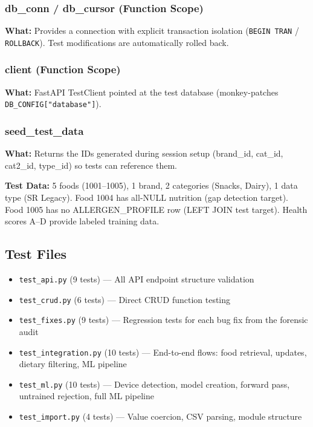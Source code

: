 \documentclass[12pt,a4paper]{article}
\begin{document}
\subsubsection{db\_conn / db\_cursor (Function Scope)}
\textbf{What:} Provides a connection with explicit transaction isolation (\texttt{BEGIN TRAN} / \texttt{ROLLBACK}). Test modifications are automatically rolled back.

\subsubsection{client (Function Scope)}
\textbf{What:} FastAPI TestClient pointed at the test database (monkey-patches \texttt{DB\_CONFIG["database"]}).

\subsubsection{seed\_test\_data}
\textbf{What:} Returns the IDs generated during session setup (brand\_id, cat\_id, cat2\_id, type\_id) so tests can reference them.

\textbf{Test Data:} 5 foods (1001–1005), 1 brand, 2 categories (Snacks, Dairy), 1 data type (SR Legacy). Food 1004 has all-NULL nutrition (gap detection target). Food 1005 has no ALLERGEN\_PROFILE row (LEFT JOIN test target). Health scores A–D provide labeled training data.

\subsection{Test Files}

\begin{itemize}[nosep]
    \item \texttt{test\_api.py} (9 tests) — All API endpoint structure validation
    \item \texttt{test\_crud.py} (6 tests) — Direct CRUD function testing
    \item \texttt{test\_fixes.py} (9 tests) — Regression tests for each bug fix from the forensic audit
    \item \texttt{test\_integration.py} (10 tests) — End-to-end flows: food retrieval, updates, dietary filtering, ML pipeline
    \item \texttt{test\_ml.py} (10 tests) — Device detection, model creation, forward pass, untrained rejection, full ML pipeline
    \item \texttt{test\_import.py} (4 tests) — Value coercion, CSV parsing, module structure
\end{itemize}
\end{document}

